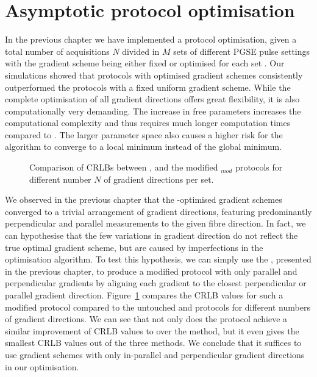 \section{Asymptotic protocol optimisation}
In the previous chapter we have implemented a \SF{} protocol optimisation, given a total number of acquisitions $N$ divided in $M$ sets of different {\gls{PGSE}} pulse settings with the gradient scheme being either fixed {\OI} or optimised  for each set {\FD}. Our simulations showed that protocols with optimised gradient schemes consistently outperformed the protocols with a fixed uniform gradient scheme. While the complete optimisation of all gradient directions offers great flexibility, it is also computationally very demanding. The increase in free parameters increases the computational complexity and thus requires much longer computation times compared to {\OI}. The larger parameter space also causes a higher risk for the algorithm to converge to a local minimum instead of the global minimum. 

\begin{figure}
\centering
	
\caption{Comparison of CRLBs between \OI{}, \SF{} and the modified \SF$_{mod}$ protocols for different number $N$ of gradient directions per set.}
\label{fig:chapter8 DIRSvsCRLB60mT mod}
\end{figure}


We observed in the previous chapter that the \SF-optimised gradient schemes converged to a trivial arrangement of gradient directions, featuring predominantly perpendicular and parallel measurements to the given fibre direction. In fact, we can hypothesise that the few variations in gradient direction do not reflect the true optimal gradient scheme, but are caused by imperfections in the optimisation algorithm. To test this hypothesis, we can simply use the \FD{}, presented in the previous chapter, to produce a modified \FDmod{} protocol with only parallel and perpendicular gradients by aligning each gradient  to the closest perpendicular or parallel gradient direction. Figure~\ref{fig:chapter8 DIRSvsCRLB60mT mod} compares the CRLB values for such a modified \FDmod{} protocol compared to the untouched \FD{} and \OI{} protocols for different numbers of gradient directions. We can see that not only does the \FDmod{} protocol achieve a similar improvement of CRLB values to \FD over the \OI method, but it even gives the smallest CRLB values out of the three methods. We conclude that it suffices to use gradient schemes with only  in-parallel and perpendicular gradient directions in our optimisation.
 

